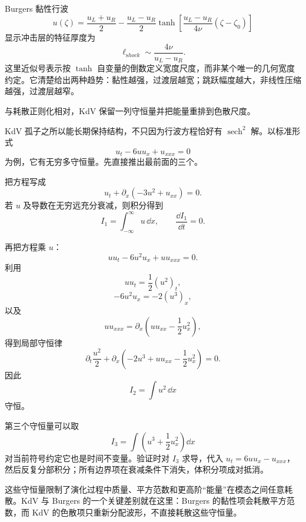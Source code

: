 Burgers 黏性行波
\[
u(\zeta)=\frac{u_L+u_R}{2}
-\frac{u_L-u_R}{2}
\tanh\!\left[
\frac{u_L-u_R}{4\nu}(\zeta-\zeta_0)
\right]
\]
显示冲击层的特征厚度为
\begin{equation*}\boxed{
\ell_{\mathrm shock}
\sim\frac{4\nu}{u_L-u_R}
}.\end{equation*}
这里近似号表示按 $\tanh$ 自变量的倒数定义宽度尺度，而非某个唯一的几何宽度约定。它清楚给出两种趋势：黏性越强，过渡层越宽；跳跃幅度越大，非线性压缩越强，过渡层越窄。

与耗散正则化相对，KdV 保留一列守恒量并把能量重排到色散尺度。

KdV 孤子之所以能长期保持结构，不只因为行波方程恰好有 $\operatorname{sech}^2$ 解。以标准形式
\[
u_t-6u u_x+u_{xxx}=0
\]
为例，它有无穷多守恒量。先直接推出最前面的三个。

把方程写成
\[
u_t+\partial_x(-3u^2+u_{xx})=0.
\]
若 $u$ 及导数在无穷远充分衰减，则积分得到
\begin{equation*}\boxed{
I_1=\int_{-\infty}^{\infty}u\,\dd x,
\qquad
\frac{\dd I_1}{\dd t}=0
}.\end{equation*}

再把方程乘 $u$：
\[
uu_t-6u^2u_x+u u_{xxx}=0.
\]
利用
\[
uu_t=\frac12(u^2)_t,
\]
\[
-6u^2u_x=-2(u^3)_x,
\]
以及
\[
uu_{xxx}
=\partial_x\left(u u_{xx}-\frac12u_x^2\right),
\]
得到局部守恒律
\[
\partial_t\frac{u^2}{2}
+\partial_x\left(
-2u^3+u u_{xx}-\frac12u_x^2
\right)=0.
\]
因此
\begin{equation*}\boxed{
I_2=\int u^2\,\dd x
}\end{equation*}
守恒。

第三个守恒量可以取
\begin{equation*}\boxed{
I_3=\int\left(u^3+\frac12u_x^2\right)\dd x
}\end{equation*}
对当前符号约定它也是时间不变量。验证时对 $I_3$ 求导，代入 $u_t=6uu_x-u_{xxx}$，然后反复分部积分；所有边界项在衰减条件下消失，体积分项成对抵消。

这些守恒量限制了演化过程中质量、平方范数和更高阶“能量”在模态之间任意耗散。KdV 与 Burgers 的一个关键差别就在这里：Burgers 的黏性项会耗散平方范数，而 KdV 的色散项只重新分配波形，不直接耗散这些守恒量。


